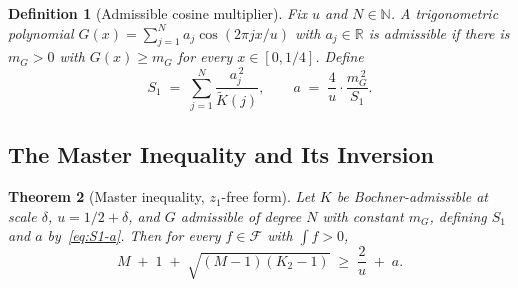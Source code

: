 \documentclass[11pt, letterpaper]{article}
\theoremstyle{paperplain}
\newtheorem{theorem}{Theorem}[section]
\theoremstyle{paperdef}
\newtheorem{definition}[theorem]{Definition}
\newcommand{\R}{\mathbb{R}}
\newcommand{\N}{\mathbb{N}}
\begin{document}
\begin{definition}[Admissible cosine multiplier]
\label{def:multiplier}
Fix $u$ and $N\in\N$.  A trigonometric polynomial
$G(x)=\sum_{j=1}^{N}a_j\cos(2\pi jx/u)$ with $a_j\in\R$ is
\emph{admissible} if there is $m_G>0$ with $G(x)\ge m_G$ for every
$x\in[0,1/4]$.  Define
\begin{equation}\label{eq:S1-a}
  S_1 \;=\; \sum_{j=1}^{N}\frac{a_j^{\,2}}{\widetilde{K}(j)},
  \qquad
  a \;=\; \frac{4}{u}\cdot\frac{m_G^{\,2}}{S_1}.
\end{equation}
\end{definition}

\subsection{The Master Inequality and Its Inversion}\label{subsec:mv-master}

\begin{theorem}[Master inequality, $z_1$-free form]
\label{thm:mv-master}
Let $K$ be Bochner-admissible at scale $\delta$, $u=1/2+\delta$,
and $G$ admissible of degree $N$ with constant $m_G$, defining $S_1$
and $a$ by~\eqref{eq:S1-a}.  Then for every $f\in\mathcal{F}$ with
$\int f>0$,
\begin{equation}\label{eq:master}
  M \;+\; 1 \;+\; \sqrt{(M-1)(K_2-1)}
  \;\ge\;
  \frac{2}{u} \;+\; a.
\end{equation}
\end{theorem}
\end{document}
